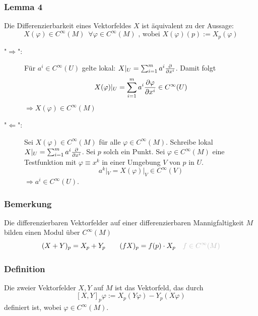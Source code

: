 \subsubsection[Lemma 4: Differenzierbarkeit eines Vektorfeldes]{Lemma 4} %
\label{ssub:212}
Die Differenzierbarkeit eines Vektorfeldes $X$ ist äquivalent zu der Aussage:
\[
	X(\varphi) \in C^\infty(M) \enspace\forall \varphi \in C^\infty(M) \text{ , wobei } X(\varphi)(p) := X_p(\varphi)
\]
\begin{description}
	\item["$\Rightarrow $":] Für $a^i \in C^\infty(U)$ gelte lokal: $X|_U = \sum_{i=1}^{m} a^i \frac{{\partial }}{{\partial x^i}}  $. Damit folgt
	\[
		X(\varphi)|_U = \sum_{i=1}^{m} a^i \frac{{\partial \varphi}}{{\partial x^i}}  \in C^\infty(U) 
	\] 
	$\Rightarrow X(\varphi) \in C^\infty(M)$
	\item["$\Leftarrow$":] Sei $X(\varphi) \in C^\infty(M)$ für alle $\varphi \in C^\infty(M)$. Schreibe lokal $X|_U = \sum_{i=1}^{m} a^i \frac{{\partial }}{{\partial x^i}} $. Sei $p$ solch ein
	Punkt. Sei $\varphi \in C^\infty(M)$ eine Testfunktion mit $\varphi \equiv x^k$ in einer Umgebung $V$ von $p$ in $U$.
	\[
		a^k|_V = X(\varphi)|_V \in C^\infty(V)
	\]
	$\Rightarrow a^i \in C^\infty(U)$. \bewende
\end{description}

\subsubsection[Bemerkung: Modul der differenzierbaren Vektorfelder auf einer Mannigfaltigkeit]{Bemerkung} %
\label{ssub:213}
Die differenzierbaren Vektorfelder auf einer differenzierbaren Mannigfaltigkeit $M$ bilden einen Modul über $C^\infty(M)$
\[
	(X +Y)_p = X_p + Y_p \qquad (f X)_p = f(p) \cdot X_p \quad {\color{lightgray} f\in C^\infty(M)}
\]

\subsubsection[Definition: Lie-Klammer]{Definition} %
\label{ssub:214}
Die  zweier Vektorfelder $X,Y$ auf $M$ ist das Vektorfeld, das durch  
\[
	[X,Y]_p \varphi := X_p (Y \varphi) - Y_p(X \varphi)
\]
definiert ist, wobei $\varphi \in C^\infty(M)$.

